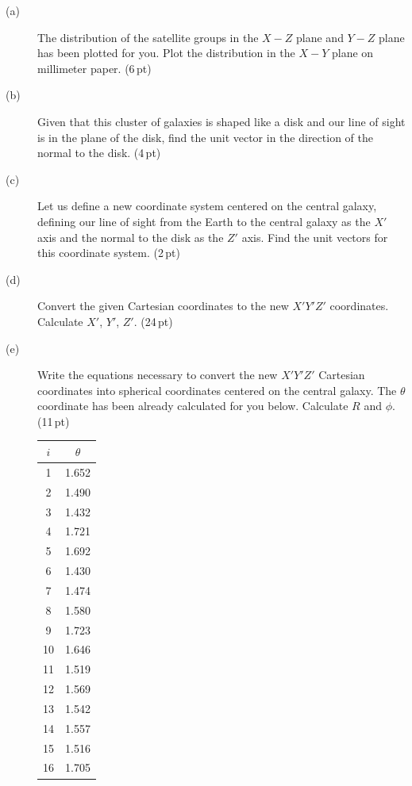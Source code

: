 \begin{description}
\item[(a)] The distribution of the satellite groups in the $X-Z$ plane and
  $Y-Z$ plane has been plotted for you. Plot the distribution in the $X-Y$
  plane on millimeter paper. \hfill(6\,pt)


\item[(b)] Given that this cluster of galaxies is shaped like a disk and our
  line of sight is in the plane of the disk, find the unit vector in the
  direction of the normal to the disk. \hfill(4\,pt)
\item[(c)] Let us define a new coordinate system centered on the central
  galaxy, defining our line of sight from the Earth to the central galaxy as
  the $X'$ axis and the normal to the disk as the $Z'$ axis. Find the unit
  vectors for this coordinate system. \hfill(2\,pt)
\item[(d)] Convert the given Cartesian coordinates to the new $X'Y'Z'$
  coordinates. Calculate $X'$, $Y'$, $Z'$. \hfill(24\,pt)
\item[(e)] Write the equations necessary to convert the new $X'Y'Z'$
  Cartesian coordinates into spherical coordinates centered on the central
  galaxy. The $\theta$ coordinate has been already calculated for you below.
  Calculate $R$ and $\phi$. \hfill(11\,pt)

  \begin{center}
  \begin{tabular}{cc}
  $i$ & $\theta$ \\
  \hline
  1  & 1.652 \\
  2  & 1.490 \\
  3  & 1.432 \\
  4  & 1.721 \\
  5  & 1.692 \\
  6  & 1.430 \\
  7  & 1.474 \\
  8  & 1.580 \\
  9  & 1.723 \\
  10 & 1.646 \\
  11 & 1.519 \\
  12 & 1.569 \\
  13 & 1.542 \\
  14 & 1.557 \\
  15 & 1.516 \\
  16 & 1.705 \\
  \end{tabular}
  \end{center}


\end{description}
